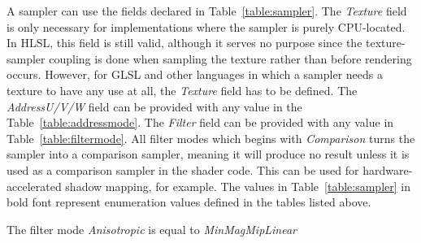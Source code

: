 \documentclass{article}
\begin{document}
A sampler can use the fields declared in Table~\ref{table:sampler}. The \textit{Texture} field is only necessary for implementations where the sampler is purely CPU-located. In HLSL, this field is still valid, although it serves no purpose since the texture-sampler coupling is done when sampling the texture rather than before rendering occurs. However, for GLSL and other languages in which a sampler needs a texture to have any use at all, the \textit{Texture} field has to be defined. The \textit{AddressU/V/W} field can be provided with any value in the Table~\ref{table:addressmode}. The \textit{Filter} field can be provided with any value in Table~\ref{table:filtermode}. All filter modes which begins with \textit{Comparison} turns the sampler into a comparison sampler, meaning it will produce no result unless it is used as a comparison sampler in the shader code. This can be used for hardware-accelerated shadow mapping, for example. The values in Table~\ref{table:sampler} in bold font represent enumeration values defined in the tables listed above.

The filter mode \textit{Anisotropic} is equal to \textit{MinMagMipLinear}

\begin{table}[float]
\caption{Sampler settings}
\label{table:sampler}
\end{table}
\end{document}

